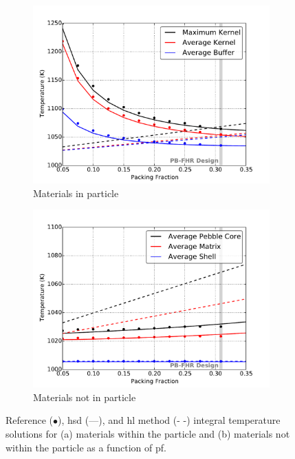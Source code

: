 \begin{figure}[!htb]
\centering
\begin{subfigure}{.49\textwidth}
  \centering
  \includegraphics[width=\linewidth]{figs/hsd_hlm_0.pdf}
  \caption{Materials in particle}
  \label{fig:hsd1}
\end{subfigure}
\begin{subfigure}{.49\textwidth}
  \centering
  \includegraphics[width=\linewidth]{figs/hsd_hlm_1.pdf}
  \caption{Materials not in particle}
  \label{fig:hsd2}
\end{subfigure}
\caption{Reference ($\bullet$), \gls{hsd} (---), and \gls{hl} method (- -) integral temperature solutions for (a) materials within the particle and (b) materials not within the particle as a function of \gls{pf}.}
\label{fig:hsd_hlm}
\end{figure}

